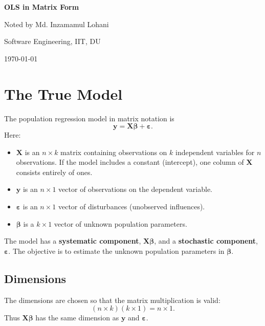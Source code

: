 \documentclass[11pt,a4paper]{article}
\numberwithin{equation}{section}
\newcommand{\topicname}{OLS in Matrix Form}
\newcommand{\eps}{\boldsymbol{\varepsilon}}
\newcommand{\XX}{\mathbf{X}}
\newcommand{\yy}{\mathbf{y}}
\begin{document}
\begin{titlepage}
  \centering
  \vspace*{\fill}
  {\Huge\bfseries \topicname\par}
  \vspace{2.5em}
  {\large Noted by Md. Inzamamul Lohani\par}
  \vspace{0.4em}
  {\large Software Engineering, IIT, DU\par}
  \vspace{2em}
  {\large \today\par}
  \vspace*{\fill}
\end{titlepage}

\setcounter{page}{2}
\tableofcontents
\newpage

\section{The True Model}

The population regression model in matrix notation is
\begin{equation}
    \boxed{\yy=\XX\boldsymbol{\beta}+\eps.}
    \label{eq:true-model}
\end{equation}
Here:
\begin{itemize}
    \item $\XX$ is an $n\times k$ matrix containing observations on $k$ independent variables for $n$ observations. If the model includes a constant (intercept), one column of $\XX$ consists entirely of ones.
    \item $\yy$ is an $n\times 1$ vector of observations on the dependent variable.
    \item $\eps$ is an $n\times 1$ vector of disturbances (unobserved influences).
    \item $\boldsymbol{\beta}$ is a $k\times 1$ vector of unknown population parameters.
\end{itemize}
The model has a \textbf{systematic component}, $\XX\boldsymbol{\beta}$, and a \textbf{stochastic component}, $\eps$. The objective is to estimate the unknown population parameters in $\boldsymbol{\beta}$.

\subsection{Dimensions}
The dimensions are chosen so that the matrix multiplication is valid:
\[
(n\times k)(k\times 1)=n\times 1.
\]
Thus $\XX\boldsymbol{\beta}$ has the same dimension as $\yy$ and $\eps$.
\end{document}
